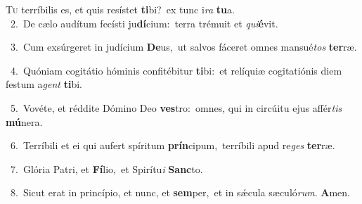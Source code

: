 \lettrine{\initial\textcolor{\initialcolor}{T}}{u} terríbilis es, et quis resístet \textbf{ti}\-bi?~\star ex tunc i\textit{ra} \textbf{tu}\-a.\\
{\numbfont\textcolor{\numbcolor}{~2.}}~De cælo audítum fecísti ju\-\textbf{dí}\-cium:~\star terra trémuit et \textit{qui}\-\textbf{é}vit.\par
{\numbfont\textcolor{\numbcolor}{~3.}}~Cum exsúrgeret in judícium \textbf{De}\-us,~\star ut salvos fáceret omnes mansué\textit{tos} \textbf{ter}\-ræ.\par
{\numbfont\textcolor{\numbcolor}{~4.}}~Quóniam cogitátio hóminis confitébitur \textbf{ti}\-bi:~\star et relíquiæ cogitatiónis diem festum a\textit{gent} \textbf{ti}\-bi.\par
{\numbfont\textcolor{\numbcolor}{~5.}}~Vovéte, et réddite Dómino Deo \textbf{ves}\-tro:~\star omnes, qui in circúitu ejus affér\textit{tis} \textbf{mú}\-nera.\par
{\numbfont\textcolor{\numbcolor}{~6.}}~Terríbili et ei qui aufert spíritum \textbf{prín}\-cipum,~\star terríbili apud re\textit{ges} \textbf{ter}\-ræ.\par
{\numbfont\textcolor{\numbcolor}{~7.}}~Glória Patri, et \textbf{Fí}\-lio,~\star et Spirítu\textit{i} \textbf{Sanc}\-to.\par
{\numbfont\textcolor{\numbcolor}{~8.}}~Sicut erat in princípio, et nunc, et \textbf{sem}\-per,~\star et in sǽcula sæculó\-\textit{rum}\-. \textbf{A}\-men.\par

